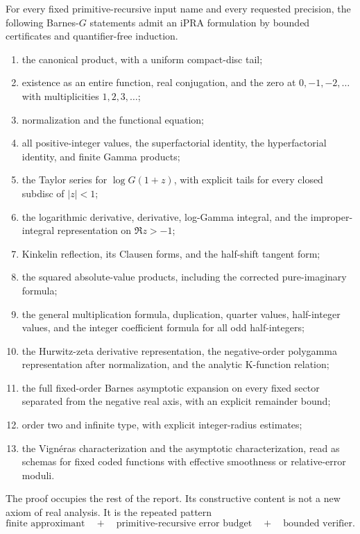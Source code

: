 \begin{theorem}\label{thm:coverage}
For every fixed primitive-recursive input name and every requested precision,
the following Barnes-$G$ statements admit an iPRA formulation by bounded
certificates and quantifier-free induction.

\begin{enumerate}[label=(\roman*)]
\item the canonical product, with a uniform compact-disc tail;
\item existence as an entire function, real conjugation, and the zero at
\(0,-1,-2,\ldots\) with multiplicities \(1,2,3,\ldots\);
\item normalization and the functional equation;
\item all positive-integer values, the superfactorial identity, the
hyperfactorial identity, and finite Gamma products;
\item the Taylor series for \(\log G(1+z)\), with explicit tails for every
closed subdisc of \(|z|<1\);
\item the logarithmic derivative, derivative, log-Gamma integral, and the
improper-integral representation on \(\Re z>-1\);
\item Kinkelin reflection, its Clausen forms, and the half-shift tangent form;
\item the squared absolute-value products, including the corrected
pure-imaginary formula;
\item the general multiplication formula, duplication, quarter values,
half-integer values, and the integer coefficient formula for all odd
half-integers;
\item the Hurwitz-zeta derivative representation, the negative-order
polygamma representation after normalization, and the analytic K-function
relation;
\item the full fixed-order Barnes asymptotic expansion on every fixed sector
separated from the negative real axis, with an explicit remainder bound;
\item order two and infinite type, with explicit integer-radius estimates;
\item the Vign\'eras characterization and the asymptotic characterization,
read as schemas for fixed coded functions with effective smoothness or
relative-error moduli.
\end{enumerate}
\end{theorem}

The proof occupies the rest of the report.  Its constructive content is not a
new axiom of real analysis.  It is the repeated pattern
\[
  \text{finite approximant}
  \quad+\quad
  \text{primitive-recursive error budget}
  \quad+\quad
  \text{bounded verifier}.
\]

